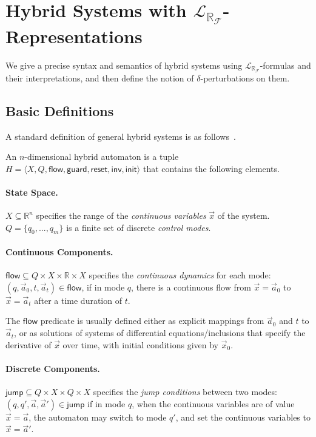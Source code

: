 \documentclass[envcountsect]{llncs}
\newcommand{\flow}{\mathsf{flow}}
\newcommand{\jump}{\mathsf{jump}}
\newcommand{\inv}{\mathsf{inv}}
\newcommand{\init}{\mathsf{init}}
\newcommand{\guard}{\mathsf{guard}}
\newcommand{\reset}{\mathsf{reset}}
\newcommand{\R}{\mathbb{R}}
\newcommand{\lrf}{\mathcal{L}_{\mathbb{R}_{\mathcal{F}}}}
\begin{document}
\section{Hybrid Systems with $\lrf$-Representations}\label{language}

We give a precise syntax and semantics of hybrid systems using
$\lrf$-formulas and their interpretations, and then define the notion of
$\delta$-perturbations on them. 

\subsection{Basic Definitions}
A standard definition of general hybrid systems is as follows~\cite{}. 
\begin{definition}\label{auto-def}
An $n$-dimensional hybrid automaton is a tuple $H   = \langle X, Q, \flow,
\guard, \reset, \inv, \init\rangle$ that contains the following elements. 
\paragraph{\bf State Space.} $X\subseteq \mathbb{R}^n$ specifies the range of
the {\em continuous variables}  $\vec x$ of the system. $Q=\{q_0,...,q_m\}$ is
a finite set of discrete {\em control modes}.

\paragraph{\bf Continuous Components.} $\flow \subseteq Q\times
X\times \R \times X$ specifies the {\em continuous dynamics}
for each mode: $(q, \vec a_0, t, \vec a_t)\in \flow$, if in mode $q$,
there is a continuous flow from $\vec x =\vec a_0$ to $\vec x = \vec a_t$
after a time duration of $t$.

The $\flow$ predicate is usually defined either as explicit mappings from
$\vec a_0$ and $t$ to $\vec a_t$,  or as solutions of systems of differential
equations/inclusions that specify the derivative of $\vec x$ over time, with
initial conditions given by $\vec x_0$.

\paragraph{\bf Discrete Components.} $\jump\subseteq Q\times
X\times Q\times X$ specifies the {\em jump conditions}
between two modes: $(q,q',\vec a,\vec a')\in \jump$ if in mode $q$,
when the continuous variables are of value $\vec x = \vec a$, the automaton may
switch to mode $q'$, and set the continuous variables to $\vec x = \vec
a'$.  


\end{definition}
\end{document}

